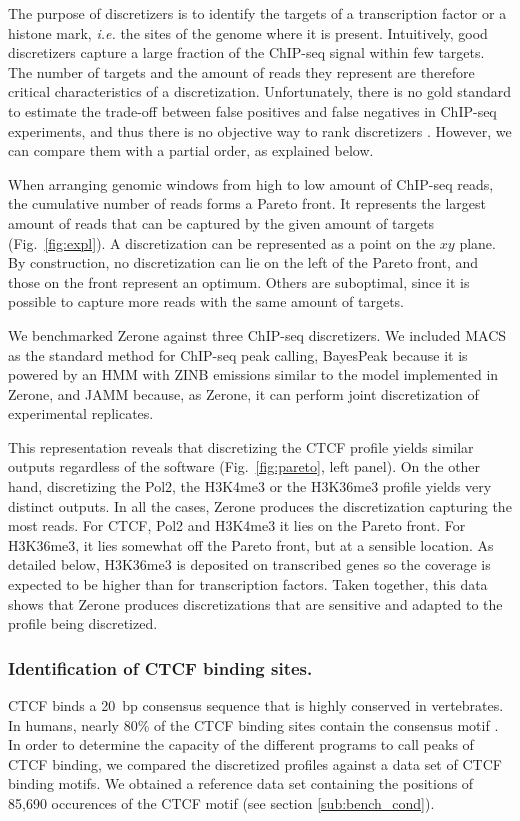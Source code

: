 \documentclass{bioinfo}
\begin{document}
The purpose of discretizers is to identify the targets of a
transcription factor or a histone mark, \textit{i.e.} the sites of
the genome where it is present.
Intuitively, good discretizers capture a large fraction of the
ChIP-seq signal within few targets. The number of targets
and the amount of reads they represent are therefore critical
characteristics of a discretization. Unfortunately, there is no gold
standard to estimate the trade-off between false positives and false
negatives in ChIP-seq experiments, and thus there is no objective way
to rank discretizers \citep{pmid21059603}. However, we can compare
them with a partial order, as explained below.

When arranging genomic windows from high to low amount of ChIP-seq
reads, the cumulative number of reads forms a Pareto front.
It represents the largest amount of reads that can be captured by the
given amount of targets (Fig.~\ref{fig:expl}). A discretization can
be represented as a point on the $xy$ plane.  By construction, no
discretization can lie on the left of the Pareto front, and those on
the front represent an optimum. Others are suboptimal, since it is
possible to capture more reads with the same amount of targets.

We benchmarked Zerone against three ChIP-seq discretizers.
We included MACS as the standard method for ChIP-seq peak calling,
BayesPeak because it is powered by an HMM with ZINB emissions
similar to the model implemented in Zerone, and JAMM because, as
Zerone, it can perform joint discretization of experimental replicates.

This representation reveals that discretizing the CTCF profile yields
similar outputs regardless of the software (Fig.~\ref{fig:pareto},
left panel). On the other hand, discretizing the Pol2, the H3K4me3 or
the H3K36me3 profile yields very distinct outputs. In
all the cases, Zerone produces the discretization capturing the most
reads. For CTCF, Pol2 and H3K4me3 it lies on the Pareto front. For
H3K36me3, it lies somewhat off the Pareto front, but at a sensible
location. As detailed below, H3K36me3 is deposited on transcribed
genes \citep{pmid16122420,pmid23739122} so the coverage is expected to
be higher than for transcription factors. Taken together, this data
shows that Zerone produces discretizations that are sensitive and
adapted to the profile being discretized.

\subsubsection{Identification of CTCF binding sites.}
CTCF binds a 20~bp consensus sequence that is highly conserved in
vertebrates. In humans, nearly 80\% of the CTCF binding sites contain
the consensus motif \citep{pmid17382889}. In order to determine the
capacity of the different programs to call peaks of CTCF binding, we
compared the discretized profiles against a data set of CTCF binding
motifs. We obtained a reference data set containing the positions of
85,690 occurences of the CTCF motif (see section
\ref{sub:bench_cond}).
\end{document}
